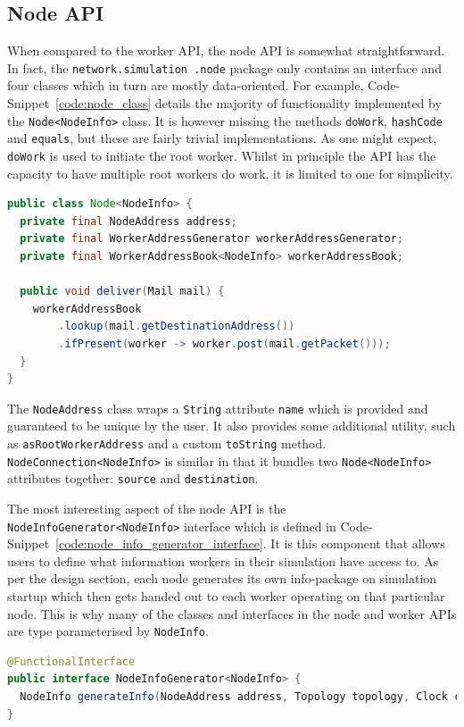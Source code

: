 \subsection{Node API}

When compared to the worker API, the node API is somewhat straightforward. In fact, the \texttt{network.simulation
.node} package only contains an interface and four classes which in turn are mostly data-oriented. For example,
Code-Snippet~\ref{code:node_class} details the majority of functionality implemented by the \texttt{Node<NodeInfo>}
class. It is however missing the methods \texttt{doWork}, \texttt{hashCode} and \texttt{equals}, but these are fairly
trivial implementations. As one might expect, \texttt{doWork} is used to initiate the root worker. Whilst in
principle the API has the capacity to have multiple root workers do work, it is limited to one for simplicity.
\begin{lstlisting}[language=Java,caption={A cut-down version of the \texttt{Node<NodeInfo>} class.},
    label={code:node_class},captionpos=b]
public class Node<NodeInfo> {
  private final NodeAddress address;
  private final WorkerAddressGenerator workerAddressGenerator;
  private final WorkerAddressBook<NodeInfo> workerAddressBook;

  public void deliver(Mail mail) {
    workerAddressBook
        .lookup(mail.getDestinationAddress())
        .ifPresent(worker -> worker.post(mail.getPacket()));
  }
}
\end{lstlisting}

The \texttt{NodeAddress} class wraps a \texttt{String} attribute \texttt{name} which is provided and guaranteed to be
unique by the user. It also provides some additional utility, such as \texttt{asRootWorkerAddress} and a custom
\texttt{toString} method. \texttt{NodeConnection<NodeInfo>} is similar in that it bundles two \texttt{Node<NodeInfo>}
attributes together: \texttt{source} and \texttt{destination}.

The most interesting aspect of the node API is the \texttt{NodeInfoGenerator<NodeInfo>} interface which is defined in
Code-Snippet~\ref{code:node_info_generator_interface}. It is this component that allows users to define what
information workers in their simulation have access to. As per the design section, each node generates its own
info-package on simulation startup which then gets handed out to each worker operating on that particular node. This
is why many of the classes and interfaces in the node and worker APIs are type parameterised by \texttt{NodeInfo}.
\begin{lstlisting}[language=Java,caption={The \texttt{NodeInfoGenerator<NodeInfo>} interface exactly as it appears in
the
codebase.},label={code:node_info_generator_interface},captionpos=b]
@FunctionalInterface
public interface NodeInfoGenerator<NodeInfo> {
  NodeInfo generateInfo(NodeAddress address, Topology topology, Clock clock);
}
\end{lstlisting}

